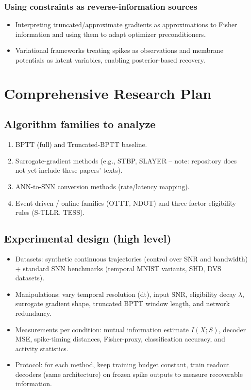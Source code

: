 \documentclass{article}
\begin{document}
\subsubsection{Using constraints as reverse-information sources}
\begin{itemize}
  \item Interpreting truncated/approximate gradients as approximations to Fisher information and using them to adapt optimizer preconditioners.
  \item Variational frameworks treating spikes as observations and membrane potentials as latent variables, enabling posterior-based recovery.
\end{itemize}

\section{Comprehensive Research Plan}
\subsection{Algorithm families to analyze}
\begin{enumerate}
  \item BPTT (full) and Truncated-BPTT baseline.
  \item Surrogate-gradient methods (e.g., STBP, SLAYER -- note: repository does not yet include these papers' texts).
  \item ANN-to-SNN conversion methods (rate/latency mapping).
  \item Event-driven / online families (OTTT, NDOT) and three-factor eligibility rules (S-TLLR, TESS).
\end{enumerate}

\subsection{Experimental design (high level)}
\begin{itemize}
  \item Datasets: synthetic continuous trajectories (control over SNR and bandwidth) + standard SNN benchmarks (temporal MNIST variants, SHD, DVS datasets).
  \item Manipulations: vary temporal resolution (dt), input SNR, eligibility decay $\lambda$, surrogate gradient shape, truncated BPTT window length, and network redundancy.
  \item Measurements per condition: mutual information estimate $I(X;S)$, decoder MSE, spike-timing distances, Fisher-proxy, classification accuracy, and activity statistics.
  \item Protocol: for each method, keep training budget constant, train readout decoders (same architecture) on frozen spike outputs to measure recoverable information.
\end{itemize}
\end{document}
